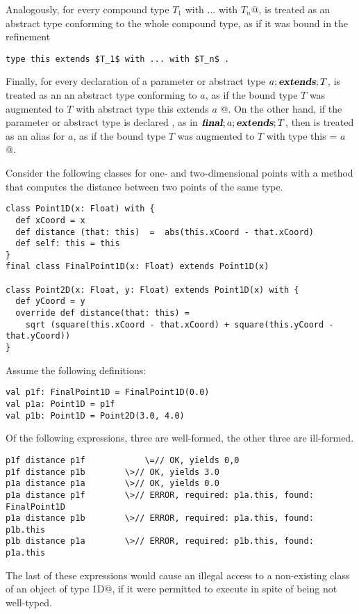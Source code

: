 \documentclass[11pt]{report}
\begin{document}
\begin{itemize}
{Analogously, for every compound type \verb@$T_1$ with ... with $T_n$@,
\verb@this@ is treated as an abstract type conforming to the whole compound
type, as if it was bound in the refinement
\begin{verbatim}
type this extends $T_1$ with ... with $T_n$ .
\end{verbatim}
Finally, for every declaration of a parameter or abstract type
\mbox{$a ;\mbox{\sl\bfseries extends}; T$}, \verb@this@ is treated as an an abstract type
conforming to $a$, as if the bound type $T$ was augmented to
\verb@$T$ with { abstract type this extends $a$ }@.
On the other hand, if the parameter or abstract type is declared
\verb@final@, as in $\mbox{\sl\bfseries final};a ;\mbox{\sl\bfseries extends}; T$, then \verb@this@ is treated as an alias
for $a$, as if the bound type $T$ was augmented to
\verb@$T$ with { type this = $a$ }@.

\example
Consider the following classes for one- and two-dimensional
points with a \verb@distance@ method that computes the distance
between two points of the same type.
\begin{verbatim}
class Point1D(x: Float) with {
  def xCoord = x
  def distance (that: this)  =  abs(this.xCoord - that.xCoord)
  def self: this = this
}
final class FinalPoint1D(x: Float) extends Point1D(x)

class Point2D(x: Float, y: Float) extends Point1D(x) with {
  def yCoord = y
  override def distance(that: this) =
    sqrt (square(this.xCoord - that.xCoord) + square(this.yCoord - that.yCoord))
}
\end{verbatim}
Assume the following definitions:
\begin{verbatim}
val p1f: FinalPoint1D = FinalPoint1D(0.0)
val p1a: Point1D = p1f
val p1b: Point1D = Point2D(3.0, 4.0)
\end{verbatim}
Of the following expressions, three are well-formed, the other three
are ill-formed.
\begin{verbatim}
p1f distance p1f            \=// OK, yields 0,0
p1f distance p1b	    \>// OK, yields 3.0
p1a distance p1a 	    \>// OK, yields 0.0
p1a distance p1f		\>// ERROR, required: p1a.this, found: FinalPoint1D
p1a distance p1b		\>// ERROR, required: p1a.this, found: p1b.this
p1b distance p1a		\>// ERROR, required: p1b.this, found: p1a.this
\end{verbatim}
The last of these expressions would cause an illegal access to a
non-existing class \verb@yCoord@ of an object of type \verb@Point1D@,
if it were permitted to execute in spite of being not well-typed.
}


\end{itemize}
\end{document}

